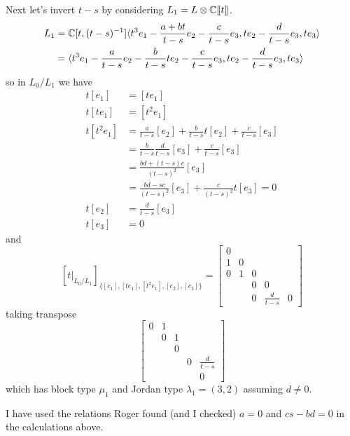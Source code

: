 \begin{example}
    Next let's invert $t-s$ by considering $L_1 = L\otimes\mathbb C[\hspace{-.12em}[ {t} ]\hspace{-.12em}]$. 
    \[
    \begin{aligned}
        L_1 &= \mathbb C[t,(t-s)^{-1}]\langle
        t^3 e_1 - \frac{a+bt}{t-s}e_2 - \frac c {t-s} e_3, te_2 - \frac d {t-s} e_3 , te_3 
        \rangle \\
        &= \langle
        t^3 e_1 - \frac{a}{t-s}e_2 - \frac b{t-s} te_2 - \frac c {t-s} e_3, te_2 - \frac d {t-s} e_3 , te_3 
        \rangle
    \end{aligned}
    \]
    so in $L_0/L_1$ we have 
    \begin{align*}
        t[e_1] &= [te_1] \\
        t[te_1] &= [t^2 e_1] \\ 
        t[t^2e_1] &= \frac{a}{t-s}[e_2] + \frac{b}{t-s} t[e_2] + \frac c {t-s} [e_3] \\
                  &= \frac b{t-s} \frac d{t-s} [e_3] + \frac c {t-s} [e_3] \\ 
                  &= \frac {bd + (t-s) c} {(t-s)^2} [e_3] \\
                  &= \frac{bd - sc}{(t-s)^2}[e_3] + \frac c {(t-s)^2} t[e_3] = 0 \\ 
        t[e_2] &= \frac d {t-s} [e_3] \\ 
        t[e_3] &= 0 
    \end{align*}
    and 
    \[
    \left[t\big|_{L_0/L_1}\right]_{\{[e_1],[te_1],[t^2e_1],[e_2],[e_3]\}} = \begin{bmatrix}
        0 \\
        1 & 0 \\
        0 & 1 & 0 \\
          & & 0 & 0 \\
          & & 0 & \frac d {t-s} & 0  
    \end{bmatrix}
    \]
    taking transpose 
    \[
        \begin{bmatrix}
            0 & 1\\
              & 0 & 1\\
              &   & 0 &  &  \\
              & & & 0 & \frac d {t-s} \\
              & & & & 0  
        \end{bmatrix}
    \]
    which has block type $\mu_1$ and Jordan type $\lambda_1 = (3,2)$ assuming $d\ne 0$.

    I have used the relations Roger found (and I checked) $a = 0$ and $cs - bd = 0$ in the calculations above. 
    

\end{example}
